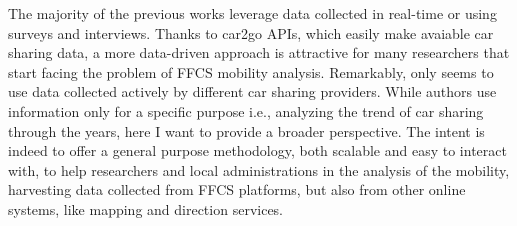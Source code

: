 The majority of the previous works \cite{Herrmann2014,Schulte2015,Wagner2015,Schmoller2015,Kopp2015,Wang2017,Kortum2016} leverage data collected in real-time or using surveys and interviews. Thanks to car2go APIs, which easily make avaiable car sharing data, a more data-driven approach is attractive for many researchers that start facing the problem of FFCS mobility analysis. Remarkably, only \cite{Kortum2016} seems to use data collected actively by different car sharing providers. While authors use information only for a specific purpose i.e., analyzing the trend of car sharing through the years, here I want to provide a broader perspective.
The intent is indeed to offer a general purpose methodology, both scalable and easy to interact with, to help researchers and local administrations in the analysis of the mobility, harvesting data collected from FFCS platforms, but also from other online systems, like mapping and direction services. 
